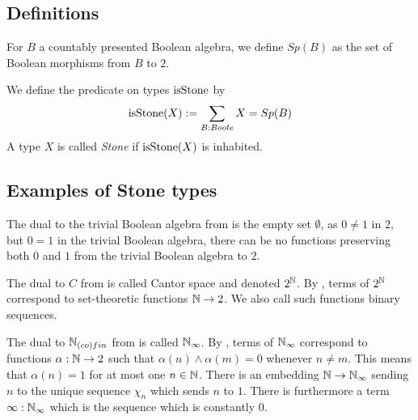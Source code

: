 \subsection{Definitions}
\begin{definition}
  For $B$ a countably presented Boolean algebra, we define $Sp(B)$ as the set of Boolean morphisms from $B$ to $2$. 
\end{definition}
\begin{definition}
  We define the predicate on types $\mathrm{isStone}$ by 
  \begin{equation}
    \mathrm{isStone}(X) := \sum\limits_{B : Boole} X = Sp(B)
  \end{equation} 
  A type $X$ is called \textit{Stone} if $\mathrm{isStone}(X)$ is inhabited.
\end{definition}
\subsection{Examples of Stone types}
\begin{example}\label{ExampleBAunderEmpty}
  The dual to the trivial Boolean algebra from  is the empty set 
  $\emptyset$, 
  as $0\neq 1$ in $2$, but $0=1$ in the trivial Boolean algebra, 
  there can be no functions preserving both $0$ and $1$ 
  from the trivial Boolean algebra to $2$. 
\end{example}
\begin{example}
  The dual to $C$ from  is called Cantor space 
  and denoted $2^{\mathbb{N}}$. 
  By , terms of $2^{\mathbb{N}}$ 
  correspond to set-theoretic functions $\mathbb{N} \to 2$. 
  We also call such functions binary sequences. 
\end{example}
\begin{example}
  The dual to $\mathbb{N}_{(co)fin}$ from  is called 
  $\mathbb{N}_\infty$. By , terms of $\mathbb{N}_\infty$ 
  correspond to functions $\alpha: \mathbb{N} \to 2$ such that $\alpha(n) \wedge \alpha(m) = 0$ 
  whenever $n \neq m$. This means that $\alpha(n) = 1$ for at most one $n\in\mathbb{N}$. 
  There is an embedding $\mathbb{N} \to \mathbb{N}_\infty$ sending $n$ to the unique sequence $\chi_n$
  which sends $n$ to $1$. 
  There is furthermore a term $\infty:\mathbb{N}_\infty$ which is the sequence which is constantly $0$. 
\end{example}
